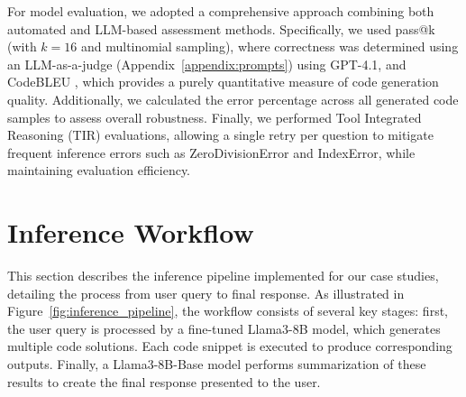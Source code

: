 For model evaluation, we adopted a comprehensive approach combining both automated and LLM-based assessment methods. Specifically, we used pass@k \citep{Levi2024SimpleModelInferenceScalingLaws} (with $k=16$ and multinomial sampling), where correctness was determined using an LLM-as-a-judge \citep{Li2025LLMJudge} (Appendix~\ref{appendix:prompts}) using GPT-4.1, and CodeBLEU \citep{Ren2020CodeBLEU}, which provides a purely quantitative measure of code generation quality. Additionally, we calculated the error percentage across all generated code samples to assess overall robustness. Finally, we performed Tool Integrated Reasoning (TIR) \citep{Fleureau2024NuminaMath} evaluations, allowing a single retry per question to mitigate frequent inference errors such as ZeroDivisionError and IndexError, while maintaining evaluation efficiency.






\section{Inference Workflow}

This section describes the inference pipeline implemented for our case studies, detailing the process from user query to final response. As illustrated in Figure~\ref{fig:inference_pipeline}, the workflow consists of several key stages: first, the user query is processed by a fine-tuned Llama3-8B model, which generates multiple code solutions. Each code snippet is executed to produce corresponding outputs. Finally, a Llama3-8B-Base model performs summarization of these results to create the final response presented to the user.

